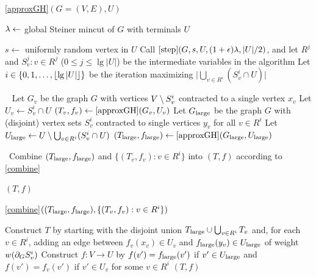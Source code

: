 \begin{algorithm}
\caption{\ref{approxGH}$(G=(V,E),U)$} 
\begin{algorithmic}[1]
\State $\lambda\gets $ global Steiner mincut of $G$ with terminals $U$ %

\State $s\gets$ uniformly random vertex in $U$
\State Call $\ref{step}(G,s,U,(1+\epsilon)\lambda,|U|/2)$, and let $R^j$ and $S^j_v:v\in R^j$ ($0\le j\le\lg|U|$) be the intermediate variables in the algorithm
\State Let $i\in\{0,1,\ldots,\lfloor\lg|U|\rfloor\}$ be the iteration maximizing $\big|\bigcup_{v\in R^i} (S^i_v\cap U)\big|$ 

\ 
 
 \State Let $G_v$ be the graph $G$ with vertices $V\setminus S^i_v$ contracted to a single vertex $x_v$ 
 \State Let $U_v\gets S^i_v\cap U$
 \State $(T_v,f_v)\gets\ref{approxGH}(G_v,U_v)$
\EndFor
\State Let $G_{\textup{large}}$ be the graph $G$ with (disjoint) vertex sets $S^i_v$ contracted to single vertices $y_v$ for all $v\in R^i$
\State Let $U_{\textup{large}}\gets U\setminus\bigcup_{v\in R^i}(S^i_v\cap U)$
\State $(T_{\textup{large}},f_{\textup{large}})\gets\ref{approxGH}(G_{\textup{large}},U_{\textup{large}})$

\
\State Combine $(T_{\textup{large}},f_{\textup{large}})$ and $\{(T_v,f_v):v\in R^i\}$ into $(T,f)$ according to \ref{combine}%

\State\Return $(T,f)$

\end{algorithmic}
\end{algorithm}


\begin{algorithm}[H]
\caption{\ref{combine}$((T_{\textup{large}},f_{\textup{large}}),\{(T_v,f_v): v\in R^i\} )$} 
\begin{algorithmic}[1]
\State Construct $T$ by starting with the disjoint union $T_{\textup{large}}\cup\bigcup_{v\in R^i}T_v$ and, for each $v\in R^i$, adding an edge between $f_v(x_v)\in U_v$ and $f_{\textup{large}}(y_v)\in U_{\textup{large}}$ of weight $w(\partial_GS^i_v)$
\State Construct $f:V\to U$ by $f(v')=f_{\textup{large}}(v')$ if $v'\in U_{\textup{large}}$ and $f(v')=f_v(v')$ if $v'\in U_v$ for some $v\in R^i$\linel{combine-f}
\State\Return $(T,f)$
\end{algorithmic}
\end{algorithm}


